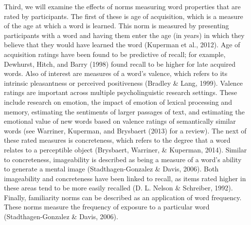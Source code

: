 \documentclass[english,man]{apa6}
\theoremstyle{definition}
\theoremstyle{definition}
\theoremstyle{definition}
\theoremstyle{remark}
\begin{document}
Third, we will examine the effects of norms measuring word properties
that are rated by participants. The first of these is age of
acquisition, which is a measure of the age at which a word is learned.
This norm is measured by presenting participants with a word and having
them enter the age (in years) in which they believe that they would have
learned the word (Kuperman et al., 2012). Age of acquisition ratings
have been found to be predictive of recall; for example, Dewhurst,
Hitch, and Barry (1998) found recall to be higher for late acquired
words. Also of interest are measures of a word's valence, which refers
to its intrinsic pleasantness or perceived positiveness (Bradley \&
Lang, 1999). Valence ratings are important across multiple
psycholinguistic research settings. These include research on emotion,
the impact of emotion of lexical processing and memory, estimating the
sentiments of larger passages of text, and estimating the emotional
value of new words based on valence ratings of semantically similar
words (see Warriner, Kuperman, and Brysbaert (2013) for a review). The
next of these rated measures is concreteness, which refers to the degree
that a word relates to a perceptible object (Brysbaert, Warriner, \&
Kuperman, 2014). Similar to concreteness, imageability is described as
being a measure of a word's ability to generate a mental image
(Stadthagen-Gonzalez \& Davis, 2006). Both imageability and concreteness
have been linked to recall, as items rated higher in these areas tend to
be more easily recalled (D. L. Nelson \& Schreiber, 1992). Finally,
familiarity norms can be described as an application of word frequency.
These norms measure the frequency of exposure to a particular word
(Stadthagen-Gonzalez \& Davis, 2006).
\end{document}

